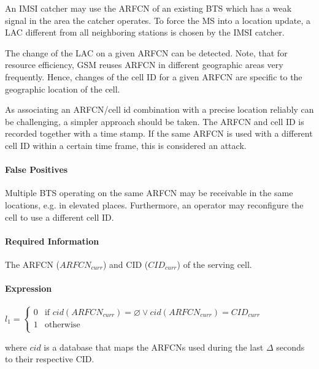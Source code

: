 \documentclass[a4paper,11pt,notitlepage,bigheadings,oneside]{scrartcl}
\begin{document}
An IMSI catcher may use the ARFCN of an existing BTS which has a weak signal in
the area the catcher operates. To force the MS into a location update, a LAC
different from all neighboring stations is chosen by the IMSI catcher.

The change of the LAC on a given ARFCN can be detected. Note, that for resource
efficiency, GSM reuses ARFCN in different geographic areas very frequently.
Hence, changes of the cell ID for a given ARFCN are specific to the geographic
location of the cell.

As associating an ARFCN/cell id combination with a precise location reliably
can be challenging, a simpler approach should be taken. The ARFCN and cell ID
is recorded together with a time stamp. If the same ARFCN is used with a
different cell ID within a certain time frame, this is considered an attack.

\paragraph{False Positives}

Multiple BTS operating on the same ARFCN may be receivable in the same
locations, e.g. in elevated places. Furthermore, an operator may reconfigure
the cell to use a different cell ID.

\paragraph{Required Information}

The ARFCN ($ARFCN_{curr}$) and CID ($CID_{curr}$) of the serving cell.

\paragraph{Expression}

$l_1 =
\begin{cases}
	0 & \text{if } cid(ARFCN_{curr}) = \varnothing \vee cid(ARFCN_{curr}) = CID_{curr} \\
	1 & \text{otherwise} \\
\end{cases}$

where $cid$ is a database that maps the ARFCNs used during the last $\Delta$
seconds to their respective CID.

\end{document}
